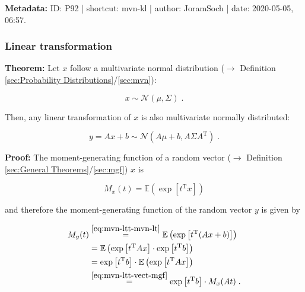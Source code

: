 \documentclass[a4paper,12pt,twoside]{book}
\begin{document}
\vspace{1em}
\textbf{Metadata:} ID: P92 | shortcut: mvn-kl | author: JoramSoch | date: 2020-05-05, 06:57.
\vspace{1em}



\subsubsection[\textbf{Linear transformation}]{Linear transformation} \label{sec:mvn-ltt}
\setcounter{equation}{0}

\textbf{Theorem:} Let $x$ follow a multivariate normal distribution ($\rightarrow$ Definition \ref{sec:Probability Distributions}/\ref{sec:mvn}):

\begin{equation} \label{eq:mvn-ltt-mvn}
x \sim \mathcal{N}(\mu, \Sigma) \; .
\end{equation}

Then, any linear transformation of $x$ is also multivariate normally distributed:

\begin{equation} \label{eq:mvn-ltt-mvn-lt}
y = Ax + b \sim \mathcal{N}(A\mu + b, A \Sigma A^\mathrm{T}) \; .
\end{equation}


\vspace{1em}
\textbf{Proof:} The moment-generating function of a random vector ($\rightarrow$ Definition \ref{sec:General Theorems}/\ref{sec:mgf}) $x$ is

\begin{equation} \label{eq:mvn-ltt-vect-mgf}
M_x(t) = \mathbb{E} \left( \exp \left[ t^\mathrm{T} x \right] \right)
\end{equation}

and therefore the moment-generating function of the random vector $y$ is given by

\begin{equation} \label{eq:mvn-ltt-y-mgf-s1}
\begin{split}
M_y(t) &\overset{\eqref{eq:mvn-ltt-mvn-lt}}{=} \mathbb{E} \left( \exp \left[ t^\mathrm{T} (Ax + b) \right] \right) \\
&= \mathbb{E} \left( \exp \left[ t^\mathrm{T} A x \right] \cdot \exp \left[ t^\mathrm{T} b \right] \right) \\
&= \exp \left[ t^\mathrm{T} b \right] \cdot \mathbb{E} \left( \exp \left[ t^\mathrm{T} A x \right] \right) \\
&\overset{\eqref{eq:mvn-ltt-vect-mgf}}{=} \exp \left[ t^\mathrm{T} b \right] \cdot M_x(At) \; .
\end{split}
\end{equation}
\end{document}
